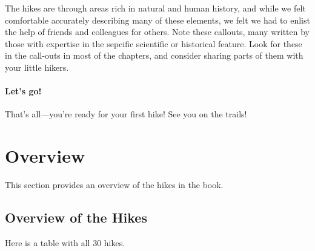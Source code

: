 \documentclass[
  letterpaper,
  DIV=11,
  numbers=noendperiod]{scrreprt}
\begin{document}
The hikes are through areas rich in natural and human history, and while
we felt comfortable accurately describing many of these elements, we
felt we had to enlist the help of friends and colleagues for others.
Note these callouts, many written by those with expertise in the
sepcific scientific or historical feature. Look for these in the
call-outs in most of the chapters, and consider sharing parts of them
with your little hikers.

\subsection{Let's go!}\label{lets-go}

That's all---you're ready for your first hike! See you on the trails!

\part{Overview}

This section provides an overview of the hikes in the book.

\chapter{Overview of the Hikes}\label{overview-of-the-hikes}

Here is a table with all 30 hikes.
\end{document}
